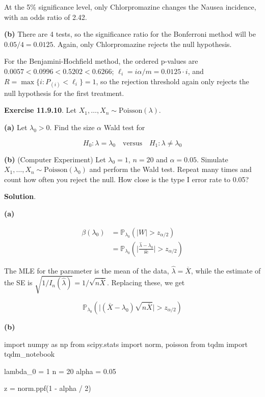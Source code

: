     At the 5\% significance level, only Chlorpromazine changes the Nausea
incidence, with an odds ratio of 2.42.

\textbf{(b)} There are 4 tests, so the significance ratio for the
Bonferroni method will be \(0.05 / 4 = 0.0125\). Again, only
Chlorpromazine rejects the null hypothesis.

For the Benjamini-Hochfield method, the ordered p-values are
\(0.0057 < 0.0996 < 0.5202 < 0.6266\);
\(\ell_i = i \alpha / m = 0.0125 \cdot i\), and
\(R = \max \{ i : P_{(i)} < \ell_i \} = 1\), so the rejection threshold
again only rejects the null hypothesis for the first treatment.

\textbf{Exercise 11.9.10}. Let
\(X_1, \dots, X_n \sim \text{Poisson}(\lambda)\).

\textbf{(a)} Let \(\lambda_0 > 0\). Find the size \(\alpha\) Wald test
for

\[ H_0: \lambda = \lambda_0 \quad \text{versus} \quad H_1: \lambda \neq \lambda_0\]

\textbf{(b)} (Computer Experiment) Let \(\lambda_0 = 1\), \(n = 20\) and
\(\alpha = 0.05\). Simulate
\(X_1, \dots, X_n \sim \text{Poisson}(\lambda_0)\) and perform the Wald
test. Repeat many times and count how often you reject the null. How
close is the type I error rate to 0.05?

\textbf{Solution}.

\textbf{(a)}

\begin{align}
\beta(\lambda_0) &= \mathbb{P}_{\lambda_0}\left( |W| > z_{\alpha/2} \right)  \\
&= \mathbb{P}_{\lambda_0}\left( \Bigg| \frac{\hat{\lambda} - \lambda_0}{\hat{\text{se}}} \Bigg| > z_{\alpha/2} \right)
\end{align}

The MLE for the parameter is the mean of the data,
\(\hat{\lambda} = \overline{X}\), while the estimate of the SE is
\(\sqrt{1 / I_n(\hat{\lambda})} = 1 / \sqrt{n\overline{X}}\). Replacing
these, we get

\[
\mathbb{P}_{\lambda_0}\left( \big| (\overline{X} - \lambda_0)\sqrt{n \overline{X}} \big| > z_{\alpha/2} \right)
\]

\textbf{(b)}

\begin{python}
import numpy as np
from scipy.stats import norm, poisson
from tqdm import tqdm_notebook

lambda_0 = 1
n = 20
alpha = 0.05

z = norm.ppf(1 - alpha / 2)
\end{python}

